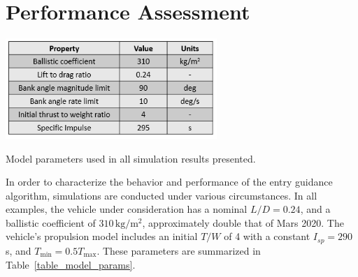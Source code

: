 \documentclass[letterpaper, paper,11pt]{AAS}
\begin{document}

%
%
%
\section{Performance Assessment}
\begin{table}[h!]
	\centering
	\includegraphics[width=0.6\textwidth]{ParamTable} 
	\caption{Model parameters used in all simulation results presented.}
	\label{table_model_params}
\end{table}
In order to characterize the behavior and performance of the entry guidance algorithm, simulations are conducted under various circumstances. In all examples, the vehicle under consideration has a nominal $L/D=0.24$, and a ballistic coefficient of $310\, \mathrm{kg/m^2}$, approximately double that of Mars 2020. The vehicle's propulsion model includes an initial $ T/W $ of 4 with a constant $ I_{sp} = 290$ s, and $T_{\min}=0.5T_{\max}$. These parameters are summarized in Table~\ref{table_model_params}.
\end{document}
